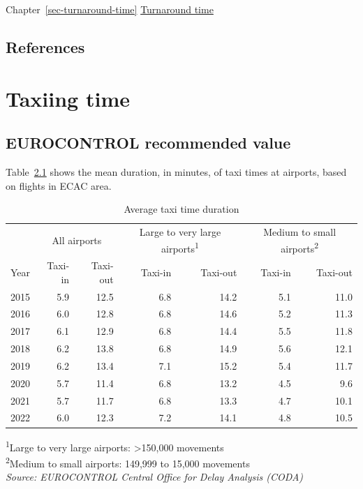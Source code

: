\documentclass[
  11pt,
  a4paper,
]{book}
\begin{document}
Chapter~\ref{sec-turnaround-time}
\protect\hyperlink{sec-turnaround-time}{Turnaround time}

\hypertarget{references-31}{%
\section{References}\label{references-31}}

\hypertarget{sec-taxiing-time}{%
\chapter{Taxiing time}\label{sec-taxiing-time}}

\hypertarget{eurocontrol-recommended-value-1}{%
\section{EUROCONTROL recommended
value}\label{eurocontrol-recommended-value-1}}

Table~\ref{tbl-taxi-time} shows the mean duration, in minutes, of taxi
times at airports, based on flights in ECAC area.

\hypertarget{tbl-taxi-time}{}
\setlength{\LTpost}{0mm}
\begin{longtable}{lrrrrrr}
\caption{\label{tbl-taxi-time}Average taxi time duration }\tabularnewline

\toprule
 & \multicolumn{2}{c}{All airports} & \multicolumn{2}{c}{Large to very large airports\textsuperscript{1}} & \multicolumn{2}{c}{Medium to small airports\textsuperscript{2}} \\ 
\cmidrule(lr){2-3} \cmidrule(lr){4-5} \cmidrule(lr){6-7}
Year & Taxi-in & Taxi-out & Taxi-in & Taxi-out & Taxi-in & Taxi-out \\ 
\midrule
2015 & 5.9 & 12.5 & 6.8 & 14.2 & 5.1 & 11.0 \\ 
2016 & 6.0 & 12.8 & 6.8 & 14.6 & 5.2 & 11.3 \\ 
2017 & 6.1 & 12.9 & 6.8 & 14.4 & 5.5 & 11.8 \\ 
2018 & 6.2 & 13.8 & 6.8 & 14.9 & 5.6 & 12.1 \\ 
2019 & 6.2 & 13.4 & 7.1 & 15.2 & 5.4 & 11.7 \\ 
2020 & 5.7 & 11.4 & 6.8 & 13.2 & 4.5 & 9.6 \\ 
2021 & 5.7 & 11.7 & 6.8 & 13.3 & 4.7 & 10.1 \\ 
2022 & 6.0 & 12.3 & 7.2 & 14.1 & 4.8 & 10.5 \\ 
\bottomrule
\end{longtable}
\begin{minipage}{\linewidth}
\textsuperscript{1}Large to very large airports: >150,000 movements\\
\textsuperscript{2}Medium to small airports: 149,999 to 15,000 movements\\
\emph{Source: EUROCONTROL Central Office for Delay Analysis (CODA)}\\
\end{minipage}
\end{document}
